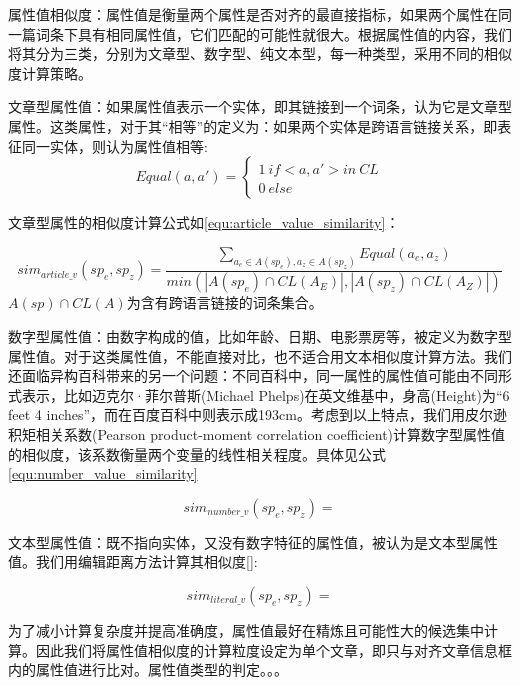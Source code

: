 属性值相似度：属性值是衡量两个属性是否对齐的最直接指标，如果两个属性在同一篇词条下具有相同属性值，它们匹配的可能性就很大。根据属性值的内容，我们将其分为三类，分别为文章型、数字型、纯文本型，每一种类型，采用不同的相似度计算策略。

文章型属性值：如果属性值表示一个实体，即其链接到一个词条，认为它是文章型属性。这类属性，对于其“相等”的定义为：如果两个实体是跨语言链接关系，即表征同一实体，则认为属性值相等:
\begin{equation}
Equal(a,a')=\left\{\begin{matrix}
1 \ if <a,a'> in \ CL\\ 
0 \ else
\end{matrix}\right.
\end{equation}

文章型属性的相似度计算公式如\ref{equ:article_value_similarity}：

\begin{equation}
\label{equ:article_value_similarity}
sim_{article\_v}(sp_e, sp_z) = \frac{\sum_{a_e\in A(sp_e), a_z \in A(sp_z)} Equal(a_e, a_z)}{min(\left| A(sp_e)\cap CL(A_E) \right|, \left|A(sp_z) \cap CL(A_Z) \right|)}
\end{equation}
$A(sp)\cap CL(A)$为含有跨语言链接的词条集合。

数字型属性值：由数字构成的值，比如年龄、日期、电影票房等，被定义为数字型属性值。对于这类属性值，不能直接对比，也不适合用文本相似度计算方法。我们还面临异构百科带来的另一个问题：不同百科中，同一属性的属性值可能由不同形式表示，比如迈克尔·菲尔普斯(Michael Phelps)在英文维基中，身高(Height)为“6 feet 4 inches”，而在百度百科中则表示成193cm。考虑到以上特点，我们用皮尔逊积矩相关系数(Pearson product-moment correlation coefficient)计算数字型属性值的相似度，该系数衡量两个变量的线性相关程度。具体见公式\ref{equ:number_value_similarity}

\begin{equation}
\label{equ:number_value_similarity}
sim_{number\_v}(sp_e, sp_z) = 
\end{equation}

文本型属性值：既不指向实体，又没有数字特征的属性值，被认为是文本型属性值。我们用编辑距离方法计算其相似度\ref{}:

\begin{equation}
\label{equ:literal_value_similarity}
sim_{literal\_v}(sp_e, sp_z) =
\end{equation}

为了减小计算复杂度并提高准确度，属性值最好在精炼且可能性大的候选集中计算。因此我们将属性值相似度的计算粒度设定为单个文章，即只与对齐文章信息框内的属性值进行比对。属性值类型的判定。。。

